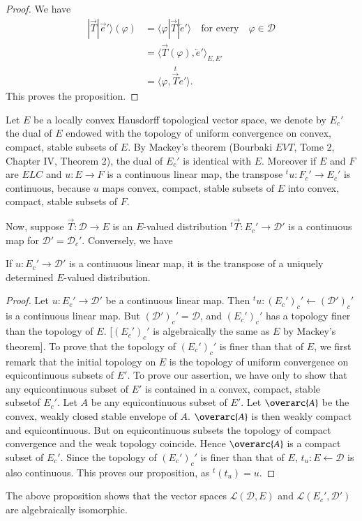 \begin{proof}
We have\pageoriginale
\begin{align*}
|\overrightarrow{T}|\overrightarrow{e}'\rangle (\varphi) &=
\langle\varphi |\overrightarrow{T}|\overleftarrow{e}'\rangle \quad
\text{for every} \quad \varphi \in \mathscr{D}\\
& = \langle\overrightarrow{T}(\varphi), \overleftarrow{e}'
\rangle_{E,E'}\\
& =
\langle\varphi,\overset{t}{\overrightarrow{T}}\overleftarrow{e}'\rangle. 
\end{align*}
This proves the proposition.
\end{proof}

Let $E$ be a locally convex Hausdorff topological vector space, we
denote by $E_c'$ the dual of $E$ endowed with the topology of uniform
convergence on convex, compact, stable subsets of $E$. By Mackey's
theorem (Bourbaki $EVT$, Tome 2, Chapter IV, Theorem 2), the dual of
$E_c'$ is identical with $E$. Moreover if $E$ and $F$ are $ELC$ and
$u:E \to F$ is a continuous linear map, the transpose ${}^tu: F_c' \to
E_c'$ is continuous, because $u$ maps convex, compact, stable subsets
of $E$ into convex, compact, stable subsets of $F$.

Now, suppose $\overrightarrow{T}:\mathscr{D}\to E$ is an $E$-valued
distribution ${}^t{\overrightarrow{T}}: E_c' \to \mathscr{D}'$
is a continuous map for $\mathscr{D}'=\mathscr{D}_c'$. Conversely, we
have 
\begin{prop}\label{chap2:prop2.2}
If $u:E_c' \to \mathscr{D}'$ is a continuous linear map, it is the
transpose of a uniquely determined $E$-valued distribution.
\end{prop}

\begin{proof}
Let $u:E_c' \to \mathscr{D}'$ be a continuous linear map. Then ${}^tu:
(E_c')_c' \leftarrow (\mathscr{D}')_c'$ is a continuous linear
map. But $(\mathscr{D}')_c'=\mathscr{D}$, and $(E_c')_c'$ has a
topology finer than the topology of $E$. [$(E_c')_c'$ is algebraically
  the same as $E$ by Mackey's theorem]. To prove that the topology of
$(E_c')_c'$ is finer than that of $E$, we first remark that the
initial topology on $E$ is the topology of uniform convergence on
equicontinuous subsets of $E'$. To prove our assertion, we have only
to show that any equicontinuous subset of $E'$ is contained in a
convex, compact, stable subset\pageoriginale of $E_c'$. Let $A$ be any
equicontinuous subset of $E'$. Let $\overarc{A}$ be the convex, weakly
closed stable envelope of $A$. $\overarc{A}$ is then weakly compact
and equicontinuous. But on equicontinuous subsets the topology of
compact convergence and the weak topology coincide. Hence
$\overarc{A}$ is a compact subset of $E_c'$. Since the topology of
$(E_c')_c'$ is finer than that of $E$, $t_u:E\leftarrow\mathscr{D}$ is
also continuous. This proves our proposition, as ${}^t(t_u)=u$.    
\end{proof}
The above proposition shows that the vector spaces
$\mathscr{L}(\mathscr{D}, E)$ and $\mathscr{L}(E_c',\mathscr{D}')$
are algebraically isomorphic. 
